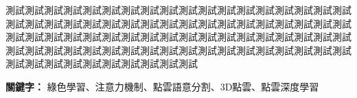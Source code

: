 \begin{abstractzh}
測試測試測試測試測試測試測試測試測試測試測試測試測試測試測試測試測試測試測試測試測試測試測試測試測試測試測試測試測試測試測試測試測試測試測試測試測試測試測試測試測試測試測試測試測試測試測試測試測試測試測試測試測試測試測試測試測試測試測試測試測試測試測試測試測試測試測試測試測試測試測試測試測試測試測試測試測試測試測試測試測試測試

\providecommand{\keywords}[1]
{
\small  
\vspace{1.5em}
\textbf{{關鍵字：}} #1
}
\keywords{綠色學習、注意力機制、點雲語意分割、3D點雲、點雲深度學習}
\end{abstractzh}
